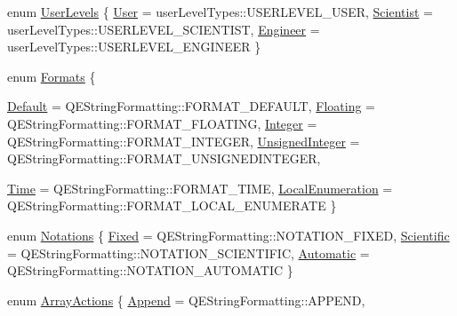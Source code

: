 \begin{DoxyCompactItemize}
\item 
enum \hyperlink{classQECheckBox_ab23fe060c72d50eaf52b879a58ee2611}{UserLevels} \{ \hyperlink{classQECheckBox_ab23fe060c72d50eaf52b879a58ee2611a2cbcb85d0e81f67ae5d6162bdacb59f8}{User} =  userLevelTypes::USERLEVEL\_\-USER, 
\hyperlink{classQECheckBox_ab23fe060c72d50eaf52b879a58ee2611aa6daf0233962bf18285c097ab1eea18d}{Scientist} =  userLevelTypes::USERLEVEL\_\-SCIENTIST, 
\hyperlink{classQECheckBox_ab23fe060c72d50eaf52b879a58ee2611aec744a8501ea0d55fe70fad2266877aa}{Engineer} =  userLevelTypes::USERLEVEL\_\-ENGINEER
 \}
\item 
enum \hyperlink{classQECheckBox_a6bcb0491c8e54ad5f8dd06b364e155b0}{Formats} \{ \par
\hyperlink{classQECheckBox_a6bcb0491c8e54ad5f8dd06b364e155b0ad4e81546b89f9099631198529cc48522}{Default} =  QEStringFormatting::FORMAT\_\-DEFAULT, 
\hyperlink{classQECheckBox_a6bcb0491c8e54ad5f8dd06b364e155b0af85a14d615c345a71c9de25ca0855b64}{Floating} =  QEStringFormatting::FORMAT\_\-FLOATING, 
\hyperlink{classQECheckBox_a6bcb0491c8e54ad5f8dd06b364e155b0a3583f369165b0f3cbf21066d71f1251b}{Integer} =  QEStringFormatting::FORMAT\_\-INTEGER, 
\hyperlink{classQECheckBox_a6bcb0491c8e54ad5f8dd06b364e155b0a490cc9783a915d4be01abce51f3deae1}{UnsignedInteger} =  QEStringFormatting::FORMAT\_\-UNSIGNEDINTEGER, 
\par
\hyperlink{classQECheckBox_a6bcb0491c8e54ad5f8dd06b364e155b0afab8ba269e603f132d1ffd4db9515f12}{Time} =  QEStringFormatting::FORMAT\_\-TIME, 
\hyperlink{classQECheckBox_a6bcb0491c8e54ad5f8dd06b364e155b0a12d7524ea122aea9b4090790a2144c26}{LocalEnumeration} =  QEStringFormatting::FORMAT\_\-LOCAL\_\-ENUMERATE
 \}
\item 
enum \hyperlink{classQECheckBox_ae67c8b643fb1a64002f65b2b4ad07d82}{Notations} \{ \hyperlink{classQECheckBox_ae67c8b643fb1a64002f65b2b4ad07d82a62f85887878c2181d4e322967e8241e0}{Fixed} =  QEStringFormatting::NOTATION\_\-FIXED, 
\hyperlink{classQECheckBox_ae67c8b643fb1a64002f65b2b4ad07d82ae2772959d2cfaa5e702e3aeeab87b0a8}{Scientific} =  QEStringFormatting::NOTATION\_\-SCIENTIFIC, 
\hyperlink{classQECheckBox_ae67c8b643fb1a64002f65b2b4ad07d82aba63f3211f2852335214221f90532feb}{Automatic} =  QEStringFormatting::NOTATION\_\-AUTOMATIC
 \}
\item 
enum \hyperlink{classQECheckBox_a5e41abe405ee8fca4bb9dbfbde1c1061}{ArrayActions} \{ \hyperlink{classQECheckBox_a5e41abe405ee8fca4bb9dbfbde1c1061a6d6594b238e9ff4b3e98685cbaaa3411}{Append} =  QEStringFormatting::APPEND, 

\end{DoxyCompactItemize}
